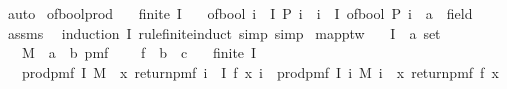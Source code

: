 \begin{isabellebody}
\ auto%
\endisatagproof
{\isafoldproof}%
%
\isadelimproof
\isanewline
%
\endisadelimproof
\isanewline
{}\isamarkupfalse%
\ of{\isacharunderscore}{\kern0pt}bool{\isacharunderscore}{\kern0pt}prod{\isacharcolon}{\kern0pt}\isanewline
\ \ \ {\isachardoublequoteopen}finite\ I{\isachardoublequoteclose}\isanewline
\ \ \ {\isachardoublequoteopen}of{\isacharunderscore}{\kern0pt}bool\ {\isacharparenleft}{\kern0pt}{\isasymforall}i\ {\isasymin}\ I{\isachardot}{\kern0pt}\ P\ i{\isacharparenright}{\kern0pt}\ {\isacharequal}{\kern0pt}\ {\isacharparenleft}{\kern0pt}{\isasymProd}i\ {\isasymin}\ I{\isachardot}{\kern0pt}\ {\isacharparenleft}{\kern0pt}of{\isacharunderscore}{\kern0pt}bool\ {\isacharparenleft}{\kern0pt}P\ i{\isacharparenright}{\kern0pt}\ {\isacharcolon}{\kern0pt}{\isacharcolon}{\kern0pt}\ {\isacharprime}{\kern0pt}a\ {\isacharcolon}{\kern0pt}{\isacharcolon}{\kern0pt}\ field{\isacharparenright}{\kern0pt}{\isacharparenright}{\kern0pt}{\isachardoublequoteclose}\isanewline
%
\isadelimproof
\ \ %
\endisadelimproof
%
\isatagproof
{}\isamarkupfalse%
\ assms\ \isamarkupfalse%
\ {\isacharparenleft}{\kern0pt}induction\ I\ rule{\isacharcolon}{\kern0pt}finite{\isacharunderscore}{\kern0pt}induct{\isacharcomma}{\kern0pt}\ simp{\isacharcomma}{\kern0pt}\ simp{\isacharparenright}{\kern0pt}%
\endisatagproof
{\isafoldproof}%
%
\isadelimproof
\isanewline
%
\endisadelimproof
\isanewline
{}\isamarkupfalse%
\ map{\isacharunderscore}{\kern0pt}ptw{\isacharcolon}{\kern0pt}\isanewline
\ \ \ I\ {\isacharcolon}{\kern0pt}{\isacharcolon}{\kern0pt}\ {\isachardoublequoteopen}{\isacharprime}{\kern0pt}a\ set{\isachardoublequoteclose}\isanewline
\ \ \ M\ {\isacharcolon}{\kern0pt}{\isacharcolon}{\kern0pt}\ {\isachardoublequoteopen}{\isacharprime}{\kern0pt}a\ {\isasymRightarrow}\ {\isacharprime}{\kern0pt}b\ pmf{\isachardoublequoteclose}\ \isanewline
\ \ \ f\ {\isacharcolon}{\kern0pt}{\isacharcolon}{\kern0pt}\ {\isachardoublequoteopen}{\isacharprime}{\kern0pt}b\ {\isasymRightarrow}\ {\isacharprime}{\kern0pt}c{\isachardoublequoteclose}\isanewline
\ \ \ {\isachardoublequoteopen}finite\ I{\isachardoublequoteclose}\isanewline
\ \ \ {\isachardoublequoteopen}prod{\isacharunderscore}{\kern0pt}pmf\ I\ M\ {\isasymbind}\ {\isacharparenleft}{\kern0pt}{\isasymlambda}x{\isachardot}{\kern0pt}\ return{\isacharunderscore}{\kern0pt}pmf\ {\isacharparenleft}{\kern0pt}{\isasymlambda}i\ {\isasymin}\ I{\isachardot}{\kern0pt}\ f\ {\isacharparenleft}{\kern0pt}x\ i{\isacharparenright}{\kern0pt}{\isacharparenright}{\kern0pt}{\isacharparenright}{\kern0pt}\ {\isacharequal}{\kern0pt}\ prod{\isacharunderscore}{\kern0pt}pmf\ I\ {\isacharparenleft}{\kern0pt}{\isasymlambda}i{\isachardot}{\kern0pt}\ {\isacharparenleft}{\kern0pt}M\ i\ {\isasymbind}\ {\isacharparenleft}{\kern0pt}{\isasymlambda}x{\isachardot}{\kern0pt}\ return{\isacharunderscore}{\kern0pt}pmf\ {\isacharparenleft}{\kern0pt}f\ x{\isacharparenright}{\kern0pt}{\isacharparenright}{\kern0pt}{\isacharparenright}{\kern0pt}{\isacharparenright}{\kern0pt}{\isachardoublequoteclose}\isanewline

\end{isabellebody}
